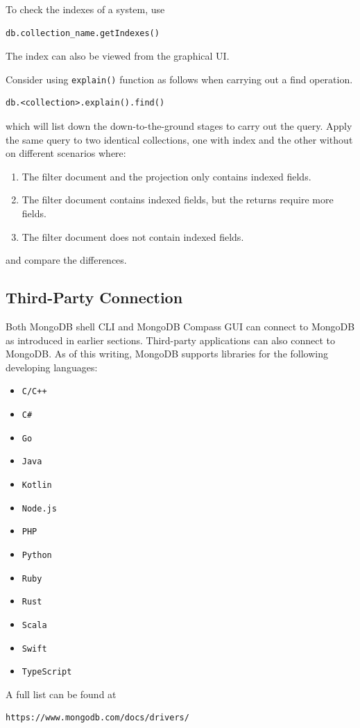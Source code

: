 To check the indexes of a system, use
\begin{lstlisting}
db.collection_name.getIndexes()
\end{lstlisting}
The index can also be viewed from the graphical UI.

Consider using \verb|explain()| function as follows when carrying out a find operation.
\begin{lstlisting}
db.<collection>.explain().find()
\end{lstlisting}
which will list down the down-to-the-ground stages to carry out the query. Apply the same query to two identical collections, one with index and the other without on different scenarios where:
\begin{enumerate}
	\item The filter document and the projection only contains indexed fields.
	\item The filter document contains indexed fields, but the returns require more fields.
	\item The filter document does not contain indexed fields.
\end{enumerate}
and compare the differences.

\subsection{Third-Party Connection}

Both MongoDB shell CLI and MongoDB Compass GUI can connect to MongoDB as introduced in earlier sections. Third-party applications can also connect to MongoDB. As of this writing, MongoDB supports libraries for the following developing languages:
\begin{multicols}{4}
\begin{itemize}
	\item \verb|C/C++|
	\item \verb|C#|
	\item \verb|Go|
	\item \verb|Java|
	\item \verb|Kotlin|
	\item \verb|Node.js|
	\item \verb|PHP|
	\item \verb|Python|
	\item \verb|Ruby|
	\item \verb|Rust|
	\item \verb|Scala|
	\item \verb|Swift|
	\item \verb|TypeScript|
\end{itemize}
\end{multicols}
A full list can be found at
\begin{lstlisting}
https://www.mongodb.com/docs/drivers/
\end{lstlisting}

